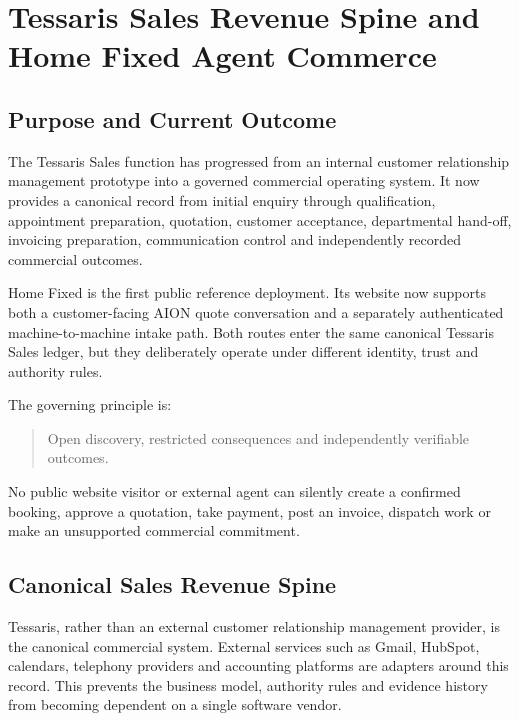 
\section{Tessaris Sales Revenue Spine and Home Fixed Agent Commerce}
\label{sec:tessaris-sales-homefixed-a2a}

\subsection{Purpose and Current Outcome}

The Tessaris Sales function has progressed from an internal customer relationship management prototype into a governed commercial operating system.  It now provides a canonical record from initial enquiry through qualification, appointment preparation, quotation, customer acceptance, departmental hand-off, invoicing preparation, communication control and independently recorded commercial outcomes.

Home Fixed is the first public reference deployment.  Its website now supports both a customer-facing AION quote conversation and a separately authenticated machine-to-machine intake path.  Both routes enter the same canonical Tessaris Sales ledger, but they deliberately operate under different identity, trust and authority rules.

The governing principle is:

\begin{quote}
Open discovery, restricted consequences and independently verifiable outcomes.
\end{quote}

No public website visitor or external agent can silently create a confirmed booking, approve a quotation, take payment, post an invoice, dispatch work or make an unsupported commercial commitment.

\subsection{Canonical Sales Revenue Spine}

Tessaris, rather than an external customer relationship management provider, is the canonical commercial system.  External services such as Gmail, HubSpot, calendars, telephony providers and accounting platforms are adapters around this record.  This prevents the business model, authority rules and evidence history from becoming dependent on a single software vendor.

